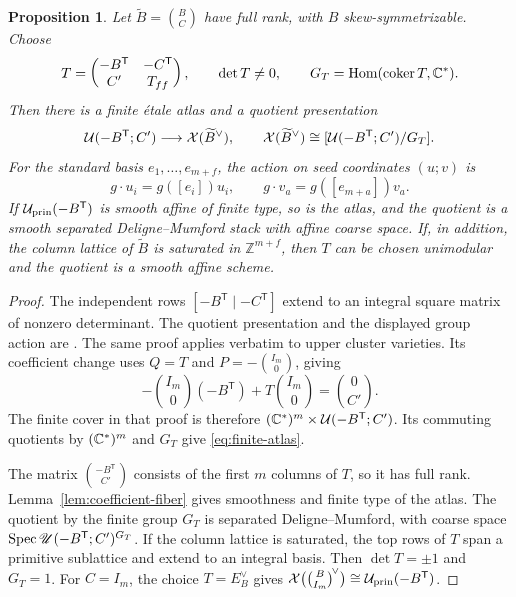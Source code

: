 \documentclass[12pt, letter]{amsart}
\newtheorem{proposition}[theorem]{Proposition}
\theoremstyle{definition}
\newcommand{\Z}{\mathbb Z}
\newcommand{\U}{\mathscr U}
\newcommand{\pr}{\mathrm{prin}}
\numberwithin{equation}{section}
\begin{document}
\begin{proposition}\label{prop:upper-finite-atlas}
Let $\widetilde B=\binom BC$ have full rank, with $B$
skew-symmetrizable. Choose
\begin{equation}\label{eq:finite-atlas-matrix}
 T=\begin{pmatrix}-B^{\mathsf T}&-C^{\mathsf T}\\ C'&T_{ff}\end{pmatrix},
 \qquad \det T\ne0,\qquad G_T=\operatorname{Hom}(\operatorname{coker} T,\mathbb C^*).
\end{equation}
Then there is a finite \'etale atlas and a quotient presentation
\begin{equation}\label{eq:finite-atlas}
 \mathcal{U}(-B^{\mathsf T};C')\longrightarrow\mathcal X(\widetilde B^\vee),
 \qquad
 \mathcal X(\widetilde B^\vee)
 \cong[\mathcal{U}(-B^{\mathsf T};C')/G_T].
\end{equation}
For the standard basis $e_1,\ldots,e_{m+f}$, the action on seed
coordinates $(u;v)$ is
\[
 g\cdot u_i=g([e_i])u_i,\qquad
 g\cdot v_a=g([e_{m+a}])v_a.
\]
If $\cU_{\pr}(-B^{\mathsf T})$ is smooth affine of finite type,
so is the atlas, and the quotient is a smooth separated
Deligne--Mumford stack with affine coarse space.
If, in addition, the column lattice of $\widetilde B$ is saturated
in $\Z^{m+f}$, then $T$ can be chosen unimodular and the quotient
is a smooth affine scheme.
\end{proposition}
\begin{proof}
The independent rows $[-B^{\mathsf T}\mid-C^{\mathsf T}]$ extend
to an integral square matrix of nonzero determinant.
The quotient presentation and the displayed group action are
\cite[Proposition~3.10]{HS}.
The same proof applies verbatim to upper cluster varieties.
Its coefficient change uses $Q=T$ and $P=-\binom{I_m}{0}$,
giving
\[
 -\binom{I_m}{0}(-B^{\mathsf T})+T\binom{I_m}{0}
 =\binom0{C'}.
\]
The finite cover in that proof is therefore
$(\mathbb C^*)^m\times\mathcal{U}(-B^{\mathsf T};C')$.
Its commuting quotients by $(\mathbb C^*)^m$ and $G_T$ give
\eqref{eq:finite-atlas}.

The matrix $\binom{-B^{\mathsf T}}{C'}$ consists of the first
$m$ columns of $T$, so it has full rank.
Lemma~\ref{lem:coefficient-fiber} gives smoothness and finite
type of the atlas.
The quotient by the finite group $G_T$ is separated
Deligne--Mumford, with coarse space
$\Spec\U(-B^{\mathsf T};C')^{G_T}$.
If the column lattice is saturated, the top rows of $T$ span
a primitive sublattice and extend to an integral basis.
Then $\det T=\pm1$ and $G_T=1$.
For $C=I_m$, the choice $T=E_B^\vee$ gives
$\mathcal X\bigl(\binom B{I_m}^{\!\vee}\bigr)
\cong\cU_{\pr}(-B^{\mathsf T})$.
\end{proof}
\end{document}
